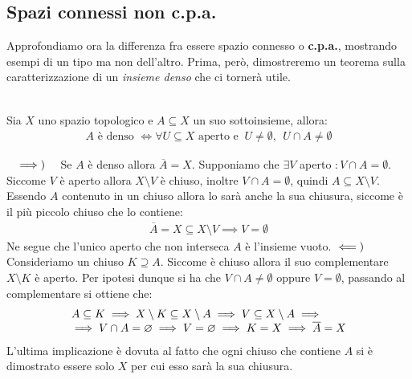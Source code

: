\subsection{Spazi connessi non c.p.a.}
Approfondiamo ora la differenza fra essere spazio connesso o \textbf{c.p.a.}, mostrando esempi di un tipo ma non dell'altro. Prima, però, dimostreremo un teorema sulla caratterizzazione di un \textit{insieme denso} che ci tornerà utile.
\begin{theorema}~{}\\
	Sia $X$ uno spazio topologico e $A\subseteq X$ un suo sottoinsieme, allora:
		\begin{gather*}
			A \text{ è denso }\iff \forall U\subseteq X \text{ aperto e } \ U\neq\emptyset, \ \ U\cap A\neq\emptyset	
		\end{gather*}
	\vspace{-6mm}
\end{theorema}
\begin{demonstration}~{}
	$\implies)\quad$ Se $A$ è denso allora $\overline{A}=X$. Supponiamo che $\exists V$ aperto $\colon V\cap A=\emptyset$. Siccome $V$ è aperto allora $X\setminus V$ è chiuso, inoltre $V\cap A=\emptyset$, quindi $A\subseteq X\setminus V$. Essendo $A$ contenuto in un chiuso allora lo sarà anche la sua chiusura, siccome è il più piccolo chiuso che lo contiene:
		\begin{gather*}
			\overline{A}=X\subseteq X\setminus V \implies V=\emptyset
		\end{gather*}
	Ne segue che l'unico aperto che non interseca $A$ è l'insieme vuoto. \newline
	$\impliedby)\quad$ Consideriamo un chiuso $K\supseteq A$. Siccome è chiuso allora il suo complementare $X\setminus K$ è aperto. Per ipotesi dunque si ha che $V\cap A\neq \emptyset$ oppure $V=\emptyset$, passando al complementare si ottiene che:
	\vspace{-1mm}
		\begin{equation*}
			\begin{array}{l}
				A\subseteq K \implies X\setminus K \subseteq X\setminus A \implies V\subseteq X\setminus A \implies \\
				\implies V\cap A=\emptyset \implies V=\emptyset \implies K=X \implies \overline{A}=X
			\end{array}
		\vspace{-2mm}
		\end{equation*}
	L'ultima implicazione è dovuta al fatto che ogni chiuso che contiene $A$ si è dimostrato essere solo $X$ per cui esso sarà la sua chiusura.
\end{demonstration}

